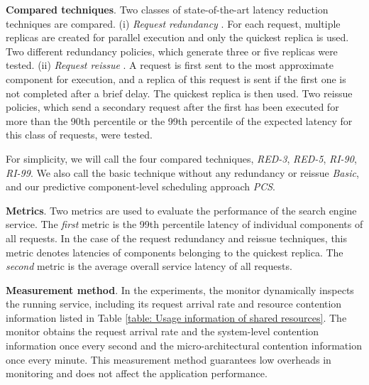 \documentclass[10pt, conference, compsocconf]{IEEEtran}
\begin{document}
\textbf{Compared techniques}.
Two classes of state-of-the-art latency reduction techniques are compared. (i) \emph{Request redundancy} \cite{vulimiri2012more, ananthanarayanan2013effective,stewart2013zoolander}. For each request, multiple replicas are created for parallel execution and only the quickest replica is used. Two different redundancy policies, which generate three or five replicas were tested. (ii) \emph{Request reissue} \cite{jalaparti2013speeding,tailatScale}. A request is first sent to the most approximate component for execution, and a replica of this request is sent if the first one is not completed after a brief delay. The quickest replica is then used. Two reissue policies, which send a secondary request after the first has been executed for more than the 90th percentile or the 99th percentile of the expected latency for this class of requests, were tested.

For simplicity, we will call the four compared techniques, \emph{RED-3}, \emph{RED-5}, \emph{RI-90}, \emph{RI-99}. We also call the basic technique without any redundancy or reissue \emph{Basic}, and our predictive component-level scheduling approach \emph{PCS}.

\textbf{Metrics}. Two metrics are used to evaluate the performance of the search engine service. The \emph{first} metric is the 99th percentile latency of individual components of all requests. In the case of the request redundancy and reissue techniques, this metric denotes latencies of components belonging to the quickest replica. The \emph{second} metric is the average overall service latency of all requests.



\textbf{Measurement method}. In the experiments, the monitor dynamically inspects the running service, including its request arrival rate and resource contention information listed in Table \ref{table: Usage information of shared resources}. The monitor obtains the request arrival rate and the system-level contention information once every second and the micro-architectural contention information once every minute. This measurement method guarantees low overheads in monitoring and does not affect the application performance.
\end{document}
